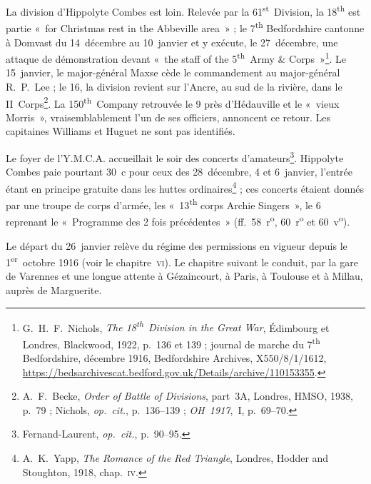 La division d'Hippolyte Combes est loin. Relevée par la 61\textsuperscript{st}~Division, la 18\textsuperscript{th} est partie «~for Christmas rest in the Abbeville area~» ; le 7\textsuperscript{th} Bedfordshire cantonne à Domvast du 14~décembre au 10~janvier et y exécute, le 27~décembre, une attaque de démonstration devant «~the staff of the 5\textsuperscript{th}~Army \& Corps~»\footnote{G.~H.~F.~Nichols, \textit{The 18\textsuperscript{th}~Division in the Great War}, Édimbourg et Londres, Blackwood, 1922, p.~136 et 139 ; journal de marche du 7\textsuperscript{th} Bedfordshire, décembre 1916, Bedfordshire Archives, X550/8/1/1612, \url{https://bedsarchivescat.bedford.gov.uk/Details/archive/110153355}.}. Le 15~janvier, le major-général Maxse cède le commandement au major-général R.~P.~Lee ; le 16, la division revient sur l'Ancre, au sud de la rivière, dans le II~Corps\footnote{A.~F.~Becke, \textit{Order of Battle of Divisions}, part~3A, Londres, HMSO, 1938, p.~79 ; Nichols, \textit{op.~cit.}, p.~136--139 ; \textit{OH~1917},~I, p.~69--70.}. La 150\textsuperscript{th}~Company retrouvée le 9 près d'Hédauville et le «~vieux Morris~», vraisemblablement l'un de ses officiers, annoncent ce retour. Les capitaines Williams et Huguet ne sont pas identifiés.

Le foyer de l'Y.M.C.A. accueillait le soir des concerts d'amateurs\footnote{Fernand-Laurent, \textit{op.~cit.}, p.~90--95.}. Hippolyte Combes paie pourtant 30~c pour ceux des 28~décembre, 4 et 6~janvier, l'entrée étant en principe gratuite dans les huttes ordinaires\footnote{A.~K.~Yapp, \textit{The Romance of the Red Triangle}, Londres, Hodder and Stoughton, 1918, chap.~\textsc{iv}.} ; ces concerts étaient donnés par une troupe de corps d'armée, les «~13\textsuperscript{th} corps Archie Singers~», le 6 reprenant le «~Programme des 2 fois précédentes~» (ff.~58~r\textsuperscript{o}, 60~r\textsuperscript{o} et 60~v\textsuperscript{o}).

Le départ du 26~janvier relève du régime des permissions en vigueur depuis le 1\textsuperscript{er}~octobre 1916 (voir le chapitre~\textsc{vi}). Le chapitre suivant le conduit, par la gare de Varennes et une longue attente à Gézaincourt, à Paris, à Toulouse et à Millau, auprès de Marguerite.
